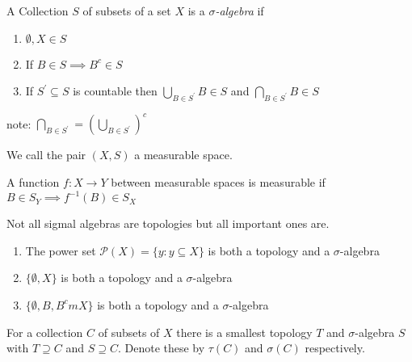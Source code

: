 \begin{definition}
	A Collection $S$ of subsets of a set $X$ is a \emph{$\sigma$-algebra} if 
	\begin{enumerate}
		\item $\emptyset, X \in S$
		\item If $B\in S \implies B^{c} \in S$
		\item If $S^{'} \subseteq S$ is countable then 
			$\bigcup\limits_{B \in S^{'}} B \in S$ and $\bigcap\limits_{B \in S^{'}} B \in S$
	\end{enumerate}
note: $\bigcap\limits_{B \in S^{'}} = (\bigcup\limits_{B \in S^{'}} )^{c}$

We call the pair $(X, S)$ a measurable space.
\end{definition}

\begin{definition}
	A function $f : X \to Y$ between measurable spaces is measurable if $B \in S_Y \implies f^{-1}(B) \in S_X$
\end{definition}

\begin{claim*}
	Not all sigmal algebras are topologies but all important ones are.
\end{claim*}

\begin{example}
	\begin{enumerate}
		\item The power set $\mathcal{P} (X) = \{y : y \subseteq X\}$ is both a topology and a $\sigma$-algebra
		\item $\{\emptyset, X\}$ is both a topology and a $\sigma$-algebra
		\item $\{\emptyset, B, B^{c}m X\}$ is both a topology and a $\sigma$-algebra
	\end{enumerate}
\end{example}

\begin{theorem}
	For a collection $C$ of subsets of $X$ there is a smallest topology $T$ and $\sigma$-algebra $S$ with $T \supseteq C$ and $S \supseteq C$.
	Denote these by $\tau(C)$ and $\sigma(C)$ respectively.
\end{theorem}

